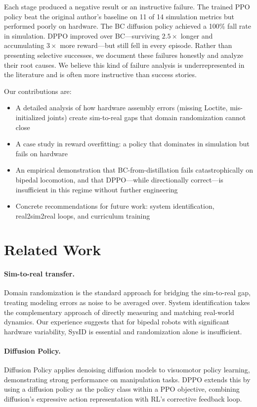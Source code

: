 \documentclass{article}
\begin{document}
Each stage produced a negative result or an instructive failure. The trained PPO policy beat the original author's baseline on 11 of 14 simulation metrics but performed poorly on hardware. The BC diffusion policy achieved a 100\% fall rate in simulation. DPPO improved over BC---surviving $2.5\times$ longer and accumulating $3\times$ more reward---but still fell in every episode. Rather than presenting selective successes, we document these failures honestly and analyze their root causes. We believe this kind of failure analysis is underrepresented in the literature and is often more instructive than success stories.

Our contributions are:
\begin{itemize}[nosep]
  \item A detailed analysis of how hardware assembly errors (missing Loctite, mis-initialized joints) create sim-to-real gaps that domain randomization cannot close
  \item A case study in reward overfitting: a policy that dominates in simulation but fails on hardware
  \item An empirical demonstration that BC-from-distillation fails catastrophically on bipedal locomotion, and that DPPO---while directionally correct---is insufficient in this regime without further engineering
  \item Concrete recommendations for future work: system identification, real2sim2real loops, and curriculum training
\end{itemize}


\section{Related Work}

\paragraph{Sim-to-real transfer.} Domain randomization \citep{tobin2017domain, peng2018sim} is the standard approach for bridging the sim-to-real gap, treating modeling errors as noise to be averaged over. System identification \citep{holladay2024robot} takes the complementary approach of directly measuring and matching real-world dynamics. Our experience suggests that for bipedal robots with significant hardware variability, SysID is essential and randomization alone is insufficient.

\paragraph{Diffusion Policy.} Diffusion Policy \citep{chi2023diffusion} applies denoising diffusion models to visuomotor policy learning, demonstrating strong performance on manipulation tasks. DPPO \citep{ren2024dppo} extends this by using a diffusion policy as the policy class within a PPO objective, combining diffusion's expressive action representation with RL's corrective feedback loop.
\end{document}
